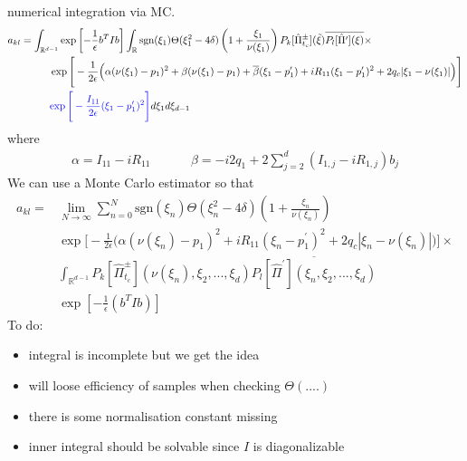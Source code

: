 numerical integration via MC.
\begin{equation}
  \begin{split}
    a_{kl}&= \int_{\mathbb{R}^{d-1}} \exp{\left[ -\frac{1}{\epsilon}b^TIb  \right]}
    \int_{\mathbb{R}} \text{sgn}(\xi_1) \Theta(\xi_1^2 - 4\delta)\left( 1 + \frac{\xi_1}{\nu(\xi_1)} \right)
      P_k[\hat{\Pi}^{\pm}_{t_c}](\tilde{\xi})
      \overline{ P_l[\hat{\Pi}^\prime](\xi)} 
    \times 
    \\
    &
    \hspace{1cm}
    \exp \Bigg[-\frac{1}{2\epsilon} 
        \Big( \alpha (\nu(\xi_1) - p_1)^2 
          + \beta (\nu(\xi_1) - p_1) + \overline{\beta} (\xi_1 - p_1^\prime)
       + 
       iR_{11}
    (\xi_1 - p_1^\prime)^2  
        + 2q_c|\xi_1 - \nu(\xi_1)|
    \Big) \Bigg]
    \\
    &
    \hspace{1cm}
    \textcolor{blue}{
    \exp \Bigg[
      -\frac{I_{11}}{2\epsilon}
    (\xi_1 - p_1^\prime)^2  
\Bigg] } d \xi_1 d\xi_{d-1}
  \end{split}
\end{equation}
where 
\begin{equation}
  \begin{split}
  \alpha = I_{11} - i R_{11} &\hspace{1cm}  
    \beta = -i2q_1 + 2\sum_{j=2}^d (I_{1,j}  - i R_{1,j})b_j 
  \end{split}
\end{equation}
We can use a Monte Carlo estimator 
so that 
\begin{equation}
  \begin{split}
    a_{kl} =& \lim_{N\to\infty}
    \sum_{n=0}^N
    \text{sgn}(\xi_n) \Theta(\xi_n^2 - 4\delta)
    \left( 1 + \frac{\xi_n}{\nu(\xi_n)} \right)
    \\
            &
    \exp \Bigg[-\frac{1}{2\epsilon} 
        \Big( \alpha (\nu(\xi_n) - p_1)^2 
       + 
       iR_{11}
    (\xi_n - p_1^\prime)^2  
        + 2q_c|\xi_n - \nu(\xi_n)|
    \Big) \Bigg]
    \times
    \\
    &\int_{\mathbb{R}^{d-1}} 
    P_k[\hat{\Pi}^{\pm}_{t_c}](\nu(\xi_n), \xi_2, ..., \xi_d)
      \overline{ P_l[\hat{\Pi}^\prime](\xi_n, \xi_2, ..., \xi_d)} 
      \\
    &
    \exp{\left[ -\frac{1}{\epsilon}(b^TIb  )  \right]}
  \end{split}
\end{equation}
To do:
\begin{itemize}
  \item integral is incomplete but we get the idea
  \item will loose efficiency of samples 
    when checking $\Theta(....)$
  \item there is some normalisation constant 
    missing
  \item inner integral should be solvable since $I$ is 
    diagonalizable
\end{itemize}
%
% 
%
%
